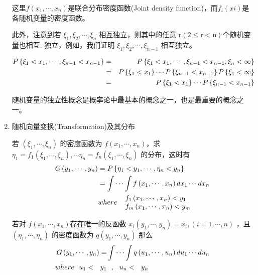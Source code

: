 \begin{enumerate}[1、]
     	这里$  f \left(x_{1}, \cdots, x_{n}\right) $是联合分布密度函数(Joint density function)，而$ f_{i}(xi)$是各随机变量的密度函数。
     	
     	此外，注意到若  $ \xi_{1}, \xi_{2}, \cdots, \xi_{n}  $ 相互独立，则其中的任意  $\mathrm{r}(2 \leqslant \mathrm{r}<\mathrm{n})  $个随机变量也相互.
     	独立，例如，我们证明 $ \xi_{1}, \xi_{2}, \cdots, \xi_{n-1} $ 相互独立。
     	
     	\vspace{-1cm}
     	\begin{eqnarray}
     	P\left\{\xi_{1}<x_{1}, \cdots, \xi_{n-1}<x_{n-1}\right\} 
     	& =  &  P\left\{\xi_{1}<x_{1}, \cdots, \xi_{n-1}<x_{n-1}, \xi_{n}<\infty\right\} \notag \\
     	& =  &  P\left\{\xi_{1}<x_{1}\right\} \cdots P\left\{\xi_{n-1}<x_{n-1}\right\} P\left\{\xi_{1}<\infty\right\} \notag \\ 
     	& =  & P\left\{\xi_{1}<x_{1}\right\} \cdots P\left\{\xi_{n-1}<x_{n-1}\right\} \notag
     	\end{eqnarray}
     	
     	随机变量的独立性概念是概率论中最基本的概念之一，也是最重要的概念之一。
    \item 随机向量变换(Transformation)及其分布
    
   	   若 $  \left(\xi_{1}, \cdots, \xi_{n}\right) $ 的密度函数为 $ f\left(x_{1}, \cdots, x_{n}\right) $，求
   	   $  \eta_{1}=f_{1}\left(\xi_{1}, \cdots, \xi_{n}\right), \cdots \eta_{n}=f_{n}\left(\xi_{1}, \cdots, \xi_{n}\right) $ 的分布，这时有
   	   \vspace{-1em}
   		\begin{eqnarray} 
	   	   	G\left(y_{1}, \cdots, y_{n}\right) &=P\left\{\eta_{1}<y_{1}, \cdots, \eta_{n}<y_{n}\right\}  \notag \\ 
	   	   	&=\int \cdots \int f\left(x_{1}, \cdots, x_{n}\right) d x_{1} \cdots d x_{n} \label{eq 2.2.3} \\    	   	
	   	   	& where \ \ \begin{array}{l}
	   	   		f_{1}\left(x_{1}, \cdots, x_{n}\right) <  y_{1} \\
	   	   		f_{m}\left(x_{1}, \cdots, x_{n}\right) <  y_{m}
	   	   	\end{array} \notag   	   	
   		\end{eqnarray} 
   	   
   	   若对 $ f\left(x_{1}, \cdots, x_{n}\right) $存在唯一的反函数 $ x_{i}\left(y_{1}, \cdots, y_{n}\right)=x_{i},(i=1, \cdots, n) $ ，且 $ \left(\eta_{1}, \cdots, \eta_{n}\right) $  的密度函数为
   	   $ q\left(y_{1}, \cdots, y_{n}\right) $ 那么
   	   	\vspace{-1em}
   	   \begin{align}
   	   	G\left(y_{1}, \cdots, y_{n}\right)=& \int \cdots \int q\left(u_{1}, \cdots, u_{n}\right) d u_{1} \cdots d u_{n} \notag \\
   	   	where \ \ u_{1} < \ \ y_{1}& \ \ ,   \ \ u_{n} <  \ \ y_{n} \label{eq 2.2.4}
   	   \end{align}
   	   

\end{enumerate}
